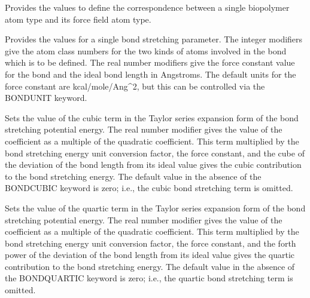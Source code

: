 \documentclass[letterpaper,11pt,english]{sphinxmanual}
\begin{document}
\ignorespaces {}\label{\detokenize{text/keywords:key-biotype}}\begin{description}
\sphinxAtStartPar
Provides the values to define the correspondence between a single biopolymer atom type and its force field atom type.

\end{description}

\ignorespaces {}\label{\detokenize{text/keywords:key-bond}}\begin{description}
\sphinxAtStartPar
Provides the values for a single bond stretching parameter. The integer modifiers give the atom class numbers for the two kinds of atoms involved in the bond which is to be defined. The real number modifiers give the force constant value for the bond and the ideal bond length in Angstroms. The default units for the force constant are kcal/mole/Ang\textasciicircum{}2, but this can be controlled via the BONDUNIT keyword.

\end{description}

\ignorespaces {}\label{\detokenize{text/keywords:key-bond-cubic}}\begin{description}
\sphinxAtStartPar
Sets the value of the cubic term in the Taylor series expansion form of the bond stretching potential energy. The real number modifier gives the value of the coefficient as a multiple of the quadratic coefficient. This term multiplied by the bond stretching energy unit conversion factor, the force constant, and the cube of the deviation of the bond length from its ideal value gives the cubic contribution to the bond stretching energy. The default value in the absence of the BOND\sphinxhyphen{}CUBIC keyword is zero; i.e., the cubic bond stretching term is omitted.

\end{description}

\ignorespaces {}\label{\detokenize{text/keywords:key-bond-quartic}}\begin{description}
\sphinxAtStartPar
Sets the value of the quartic term in the Taylor series expansion form of the bond stretching potential energy. The real number modifier gives the value of the coefficient as a multiple of the quadratic coefficient. This term multiplied by the bond stretching energy unit conversion factor, the force constant, and the forth power of the deviation of the bond length from its ideal value gives the quartic contribution to the bond stretching energy. The default value in the absence of the BOND\sphinxhyphen{}QUARTIC keyword is zero; i.e., the quartic bond stretching term is omitted.

\end{description}
\end{document}
